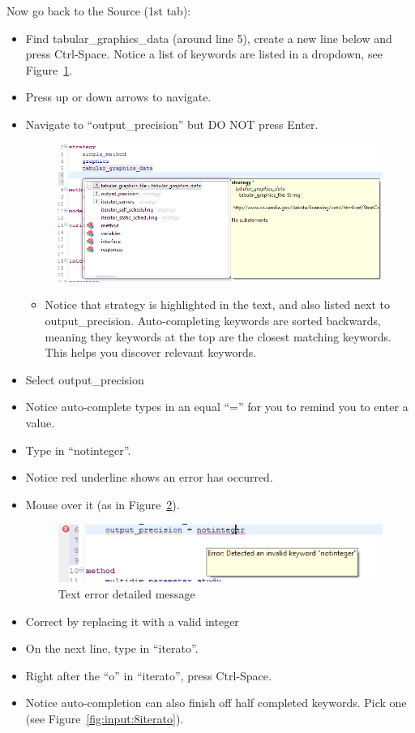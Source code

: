 Now go back to the Source (1st tab):
\begin{itemize}
\item Find tabular\_graphics\_data (around line 5), create a new line below and press Ctrl-Space. Notice a list of keywords are listed in a dropdown, see Figure~\ref{fig:input:6Autocomplete}.
\item Press up or down arrows to navigate.
\item Navigate to ``output\_precision'' but DO NOT press Enter.
\begin{figure}[htbp]
  \centering
  \includegraphics[scale=0.6]{images/6Autocomplete}
  \caption{}
  \label{fig:input:6Autocomplete}
\end{figure}
\begin{itemize}
\item Notice that strategy is highlighted in the text, and also listed next to output\_precision. Auto-completing keywords are sorted backwards, meaning they keywords at the top are the closest matching keywords. This helps you discover relevant keywords.
\end{itemize}
\item Select output\_precision
\item Notice auto-complete types in an equal ``='' for you to remind you to enter a value.
\item Type in ``notinteger''.
\item Notice red underline shows an error has occurred.
\item Mouse over it (as in Figure~\ref{fig:input:7texterror}).
\begin{figure}[htbp]
  \centering
  \includegraphics[scale=0.6]{images/7texterror}
  \caption{Text error detailed message}
  \label{fig:input:7texterror}
\end{figure}
\item Correct by replacing it with a valid integer
\item On the next line, type in ``iterato''.
\item Right after the ``o'' in ``iterato'', press Ctrl-Space.
\item Notice auto-completion can also finish off half completed keywords. Pick one (see Figure~\ref{fig:input:8iterato}).
\end{itemize}
